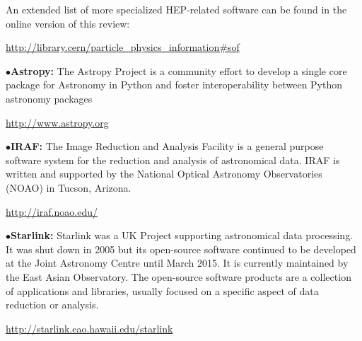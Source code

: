 



An extended list of more specialized HEP-related software can be found in the online version of this review:
	\item{}\qquad\url{http://library.cern/particle_physics_information#sof}


\medskip

%

\medskip

\item{$\bullet$}{\bf Astropy:}
The Astropy Project is a community effort to develop a single core package for Astronomy in Python and foster interoperability between Python astronomy packages
	\item{}\qquad\url{http://www.astropy.org}

\medskip

\item{$\bullet$}{\bf IRAF:}
The Image Reduction and Analysis Facility is a general purpose software system for the reduction and analysis of astronomical data. IRAF is written and supported by the National Optical Astronomy Observatories (NOAO) in Tucson, Arizona.
	\item{}\qquad\url{http://iraf.noao.edu/}

\medskip

\item{$\bullet$}{\bf Starlink:}
Starlink was a UK Project supporting astronomical data processing. It was shut down in 2005 but its open-source software continued to be developed at the Joint Astronomy Centre until March 2015. It is currently maintained by the East Asian Observatory. The open-source software products are a collection of applications and libraries, usually focused on a specific aspect of data reduction or analysis.
	\item{}\qquad\url{http://starlink.eao.hawaii.edu/starlink}

